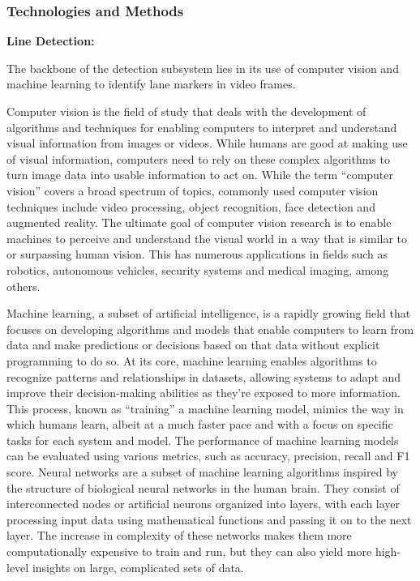 \documentclass[titlepage, draft]{article}
\begin{document}
\subsubsection{Technologies and Methods}

\textbf{Line Detection:}

The backbone of the detection subsystem lies in its use of computer vision and machine learning to identify lane markers in video
frames.

Computer vision is the field of study that deals with the development of algorithms and techniques for enabling computers
to interpret and understand visual information from images or videos.
While humans are good at making use of visual information, computers need to rely on these complex algorithms to turn image
data into usable information to act on.
While the term ``computer vision'' covers a broad spectrum of topics, commonly used computer vision techniques include video
processing, object recognition, face detection and augmented reality.
The ultimate goal of computer vision research is to enable machines to perceive and understand the visual world in a way that
is similar to or surpassing human vision.
This has numerous applications in fields such as robotics, autonomous vehicles, security systems and medical imaging, among
others.

Machine learning, a subset of artificial intelligence, is a rapidly growing field that focuses on developing algorithms and
models that enable computers to learn from data and make predictions or decisions based on that data without explicit programming
to do so.
At its core, machine learning enables algorithms to recognize patterns and relationships in datasets, allowing systems to adapt
and improve their decision-making abilities as they're exposed to more information.
This process, known as ``training'' a machine learning model, mimics the way in which humans learn, albeit at a much faster pace
and with a focus on specific tasks for each system and model.
The performance of machine learning models can be evaluated using various metrics, such as accuracy, precision, recall and F1
score.
Neural networks are a subset of machine learning algorithms inspired by the structure of biological neural networks in the human
brain.
They consist of interconnected nodes or artificial neurons organized into layers, with each layer processing input data using
mathematical functions and passing it on to the next layer.
The increase in complexity of these networks makes them more computationally expensive to train and run, but they can also yield
more high-level insights on large, complicated sets of data.
\end{document}
